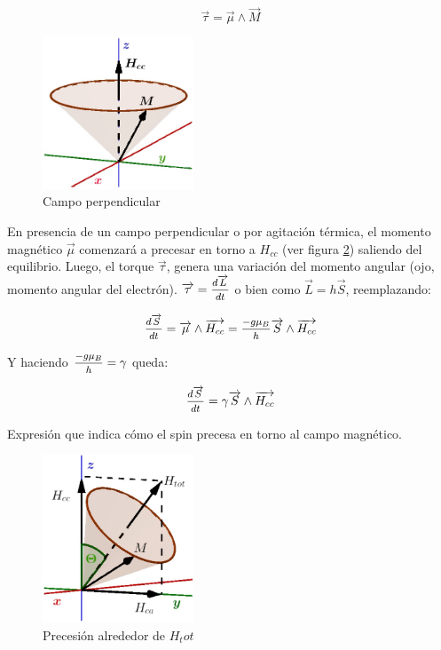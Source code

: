 \begin{equation}
	\overrightarrow{\tau}= \overrightarrow{\mu}\wedge \overrightarrow{M}
\end{equation}

\begin{figure}[H]
    \centering
    \includegraphics[width=0.4\textwidth]{./Figures/fig330}
	\caption{Campo perpendicular}
	\label{fig:330}
\end{figure}

En presencia de un campo perpendicular o por agitación térmica, el momento magnético $\overrightarrow{\mu}$ comenzará a precesar en torno a $H_{cc}$ (ver figura \ref{fig:331}) saliendo del equilibrio. Luego, el torque $\overrightarrow{\tau}$, genera una variación del momento angular (ojo, momento angular del electrón). $\overrightarrow{\tau}=\mfrac{d\overrightarrow{L}}{dt}$ o bien como $\overrightarrow{L}=h\overrightarrow{S}$, reemplazando:

\begin{equation}
	\mfrac{d\overrightarrow{S}}{dt}=\overrightarrow{\mu} \wedge \overrightarrow{H_{cc}}= \mfrac{-g \mu_{B}}{h} \overrightarrow{S} \wedge \overrightarrow{H_{cc}}
\end{equation}

Y haciendo $\mfrac{-g \mu_{B}}{h} = \gamma$  queda:

\begin{equation}
	\mfrac{d\overrightarrow{S}}{dt}= \gamma \overrightarrow{S} \wedge \overrightarrow{H_{cc}}
\end{equation}

Expresión que indica cómo el spin precesa en torno al campo magnético.

\begin{figure}[H]
    \centering
    \includegraphics[width=0.4\textwidth]{./Figures/fig331}
	\caption{Precesión alrededor de $H_tot$}
	\label{fig:331}
\end{figure}

